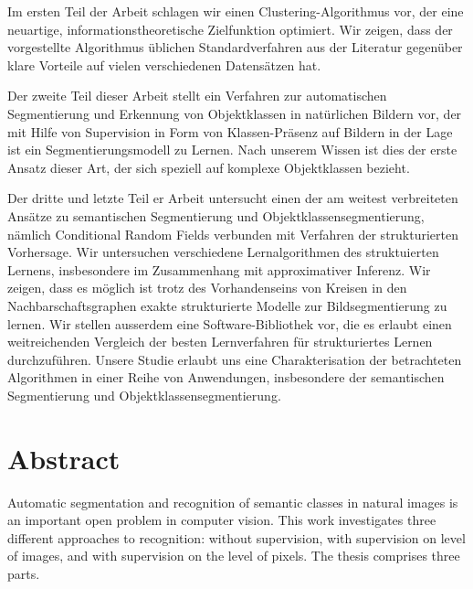 \documentclass[12pt,toc=bibnumbered, a4paper,twoside,DIV=11,BCOR=.5cm]{scrbook}
\begin{document}
Im ersten Teil der Arbeit schlagen wir einen Clustering-Algorithmus vor,
der eine neuartige, informationstheoretische Zielfunktion optimiert. Wir zeigen, dass
der vorgestellte Algorithmus \"ublichen Standardverfahren aus der Literatur gegen\"uber
klare Vorteile auf vielen verschiedenen Datens\"atzen hat.

Der zweite Teil dieser Arbeit stellt ein Verfahren zur automatischen
Segmentierung und Erkennung von Objektklassen in nat\"urlichen Bildern vor, der
mit Hilfe von Supervision in Form von Klassen-Pr\"asenz auf Bildern in der Lage
ist ein Segmentierungsmodell zu Lernen. Nach unserem Wissen ist dies der erste
Ansatz dieser Art, der sich speziell auf komplexe Objektklassen bezieht.

Der dritte und letzte Teil er Arbeit untersucht einen der am weitest
verbreiteten Ans\"atze zu semantischen Segmentierung und
Objektklassensegmentierung, n\"amlich Conditional Random Fields verbunden mit Verfahren
der strukturierten Vorhersage.
%
Wir untersuchen verschiedene Lernalgorithmen des struktuierten Lernens, insbesondere
im Zusammenhang mit approximativer Inferenz. Wir zeigen, dass es m\"oglich ist trotz des Vorhandenseins von
Kreisen in den Nachbarschaftsgraphen exakte strukturierte Modelle zur Bildsegmentierung zu lernen.
Wir stellen ausserdem eine Software-Bibliothek vor, die es erlaubt einen
weitreichenden Vergleich der besten Lernverfahren f\"ur strukturiertes Lernen
durchzuf\"uhren.
Unsere Studie erlaubt uns eine Charakterisation der betrachteten Algorithmen
in einer Reihe von Anwendungen, insbesondere der semantischen Segmentierung und
Objektklassensegmentierung.

\chapter*{Abstract}
Automatic segmentation and recognition of semantic classes in natural images is
an important open problem in computer vision.
This work investigates three different approaches to recognition: without supervision,
with supervision on level of images, and with supervision on the level of pixels.
The thesis comprises three parts.
\end{document}

